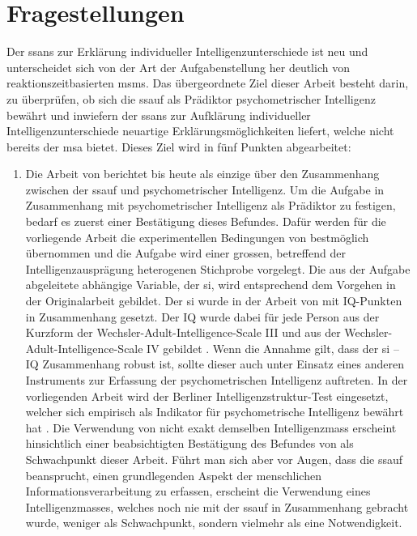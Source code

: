 \documentclass[11pt, twoside, a4paper]{book}		%
\begin{document}
\section{Fragestellungen \label{sec:Fragestellungen}}

Der \gls{ssans} zur Erklärung individueller Intelligenzunterschiede ist neu und unterscheidet sich von der Art der Aufgabenstellung her deutlich von reaktionszeitbasierten \glspl{msm}. Das übergeordnete Ziel dieser Arbeit besteht darin, zu überprüfen, ob sich die \gls{ssauf} als Prädiktor psychometrischer Intelligenz bewährt und inwiefern der \gls{ssans} zur Aufklärung individueller Intelligenzunterschiede neuartige Erklärungsmöglichkeiten liefert, welche nicht bereits der \gls{msa} bietet. Dieses Ziel wird in fünf Punkten abgearbeitet:

\begin{enumerate}
	\item Die Arbeit von \citet{Melnick2013} berichtet bis heute als einzige über den Zusammenhang zwischen der \gls{ssauf} und psychometrischer Intelligenz. Um die Aufgabe in Zusammenhang mit psychometrischer Intelligenz als Prädiktor zu festigen, bedarf es zuerst einer Bestätigung dieses Befundes. Dafür werden für die vorliegende Arbeit die experimentellen Bedingungen von \citet{Melnick2013} bestmöglich übernommen und die Aufgabe wird einer grossen, betreffend der Intelligenzausprägung heterogenen Stichprobe vorgelegt. Die aus der Aufgabe abgeleitete abhängige Variable, der \gls{si}, wird entsprechend dem Vorgehen in der Originalarbeit gebildet. Der \gls{si} wurde in der Arbeit von \citeauthor{Melnick2013} mit IQ-Punkten in Zusammenhang gesetzt. Der IQ wurde dabei für jede Person aus der Kurzform der Wechsler-Adult-Intelligence-Scale III \citep{Axelrod2002} und aus der Wechsler-Adult-In\-tell\-igence-Scale IV \citep{Wechsler2008} gebildet \citep[siehe Studie 1 und 2 bei][]{Melnick2013}. Wenn die Annahme gilt, dass der \gls{si} -- IQ Zusammenhang robust ist, sollte dieser auch unter Einsatz eines anderen Instruments zur Erfassung der psychometrischen Intelligenz auftreten. In der  vorliegenden Arbeit wird der Berliner Intelligenzstruktur-Test \citep{Jaeger1997} eingesetzt, welcher sich empirisch als Indikator für psychometrische Intelligenz bewährt hat \citep{Beauducel2002, Valerius2014}. Die Verwendung von nicht exakt demselben Intelligenzmass erscheint hinsichtlich einer beabsichtigten Bestätigung des Befundes von \citeauthor{Melnick2013} als Schwachpunkt dieser Arbeit. Führt man sich aber vor Augen, dass die \gls{ssauf} beansprucht, einen grundlegenden Aspekt der menschlichen Informationsverarbeitung zu erfassen, erscheint die Verwendung eines Intelligenzmasses, welches noch nie mit der \gls{ssauf} in Zusammenhang gebracht wurde, weniger als Schwachpunkt, sondern vielmehr als eine Notwendigkeit.


\end{enumerate}
\end{document}
